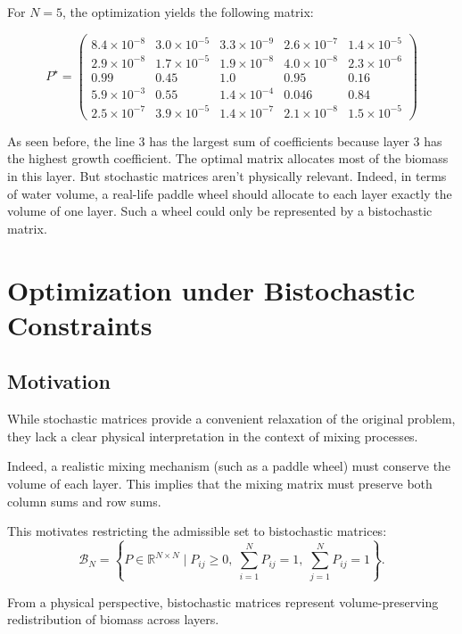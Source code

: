 \documentclass{article}
\begin{document}
For $N = \text{5}$, the optimization yields the following matrix:

\[
P^\star =
\begin{pmatrix}
8.4\times 10^{-8} & 3.0\times 10^{-5} & 3.3\times 10^{-9} & 2.6\times 10^{-7} & 1.4\times 10^{-5} \\
2.9\times 10^{-8} & 1.7\times 10^{-5} & 1.9\times 10^{-8} & 4.0\times 10^{-8} & 2.3\times 10^{-6} \\
0.99 & 0.45 & 1.0 & 0.95 & 0.16 \\
5.9\times 10^{-3} & 0.55 & 1.4\times 10^{-4} & 0.046 & 0.84 \\
2.5\times 10^{-7} & 3.9\times 10^{-5} & 1.4\times 10^{-7} & 2.1\times 10^{-8} & 1.5\times 10^{-5}
\end{pmatrix}
\]

As seen before, the line 3 has the largest sum of coefficients because layer 3 has the highest growth coefficient. The optimal matrix allocates most of the biomass in this layer.
But stochastic matrices aren't physically relevant. Indeed, in terms of water volume, a real-life paddle wheel should allocate to each layer exactly the volume of one layer. 
Such a wheel could only be represented by a bistochastic matrix.

\section{Optimization under Bistochastic Constraints}

\subsection{Motivation}

While stochastic matrices provide a convenient relaxation of the original problem, 
they lack a clear physical interpretation in the context of mixing processes.

Indeed, a realistic mixing mechanism (such as a paddle wheel) must conserve the volume 
of each layer. This implies that the mixing matrix must preserve both column sums 
and row sums.

This motivates restricting the admissible set to bistochastic matrices:
\[
\mathcal{B}_N = \left\{ P \in \mathbb{R}^{N \times N} \mid P_{ij} \geq 0,\;
\sum_{i=1}^{N} P_{ij} = 1,\;
\sum_{j=1}^{N} P_{ij} = 1 \right\}.
\]

From a physical perspective, bistochastic matrices represent volume-preserving 
redistribution of biomass across layers.
\end{document}
